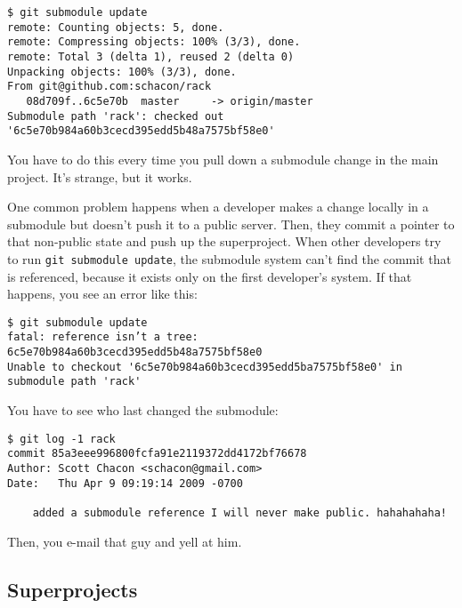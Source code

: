 \documentclass[a4paper]{book}
\begin{document}
\begin{shaded}\begin{verbatim}
$ git submodule update
remote: Counting objects: 5, done.
remote: Compressing objects: 100% (3/3), done.
remote: Total 3 (delta 1), reused 2 (delta 0)
Unpacking objects: 100% (3/3), done.
From git@github.com:schacon/rack
   08d709f..6c5e70b  master     -> origin/master
Submodule path 'rack': checked out '6c5e70b984a60b3cecd395edd5b48a7575bf58e0'
\end{verbatim}\end{shaded}

You have to do this every time you pull down a submodule change in the main project. It's strange, but it works.

One common problem happens when a developer makes a change locally in a submodule but doesn't push it to a public server. Then, they commit a pointer to that non-public state and push up the superproject. When other developers try to run \texttt{git submodule update}, the submodule system can't find the commit that is referenced, because it exists only on the first developer's system. If that happens, you see an error like this:

\begin{shaded}\begin{verbatim}
$ git submodule update
fatal: reference isn’t a tree: 6c5e70b984a60b3cecd395edd5b48a7575bf58e0
Unable to checkout '6c5e70b984a60b3cecd395edd5ba7575bf58e0' in submodule path 'rack'
\end{verbatim}\end{shaded}

You have to see who last changed the submodule:

\begin{shaded}\begin{verbatim}
$ git log -1 rack
commit 85a3eee996800fcfa91e2119372dd4172bf76678
Author: Scott Chacon <schacon@gmail.com>
Date:   Thu Apr 9 09:19:14 2009 -0700

    added a submodule reference I will never make public. hahahahaha!
\end{verbatim}\end{shaded}

Then, you e-mail that guy and yell at him.

\subsection{Superprojects}\label{superprojects}
\end{document}
